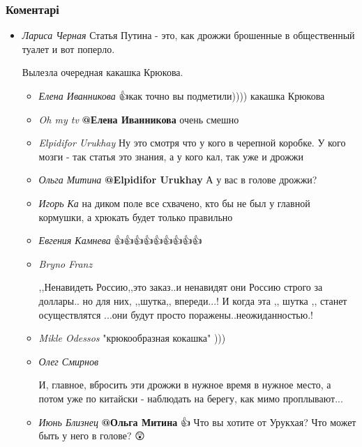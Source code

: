  
 
 
 
 
\subsubsection{Коментарі}

\begin{itemize}
\item \emph{Лариса Черная}
Статья Путина - это, как дрожжи брошенные в общественный туалет и вот поперло.

Вылезла очередная какашка Крюкова.

\begin{itemize}
\item \emph{Елена Иванникова}
👍как точно вы подметили)))) какашка Крюкова🤣🤣

\item \emph{Oh my tv}
\textbf{@Елена Иванникова}  очень смешно

\item \emph{Elpidifor Urukhay}
Ну это смотря что у кого в черепной коробке. У кого мозги - так статья это знания, а у кого кал, так уже и дрожжи

\item \emph{Ольга Митина}
\textbf{@Elpidifor Urukhay}  А у вас в голове  дрожжи?

\item \emph{Игорь Ка}
на диком поле все схвачено, кто бы не был у главной кормушки, а хрюкать будет только правильно

\item \emph{Евгения Камнева}
👍👍👍👍👍👍👍👍👍

\item \emph{Bryno Franz}

,,Ненавидеть  Россию,,это заказ..и ненавидят они Россию  строго за доллары.. но
для них,  ,,шутка,, впереди...! И когда эта ,, шутка ,,  станет осуществлятся
...они будут просто поражены..неожиданностью.!

\item \emph{Mikle Odessos}
"крюкообразная кокашка" 
)))

\item \emph{Олег Смирнов}

И, главное, вбросить эти дрожжи в нужное время в нужное место, а потом уже по
китайски - наблюдать на берегу, как мимо проплывают...

\item \emph{Июнь Близнец}
\textbf{@Ольга Митина}  👍 Что вы хотите от Урукхая?  Что может быть у него в голове? 😲

\end{itemize}
\end{itemize}
